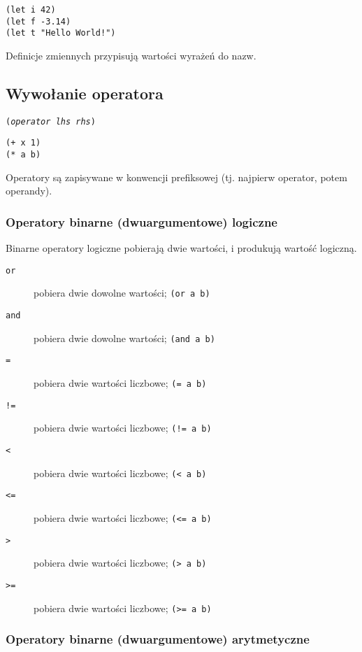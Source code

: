 \documentclass[11pt,oneside,a4paper,titlepage,onecolumn]{article}
\begin{document}
\begin{lstlisting}
(let i 42)
(let f -3.14)
(let t "Hello World!")
\end{lstlisting}

Definicje zmiennych przypisują wartości wyrażeń do nazw.

\subsection{Wywołanie operatora}

\texttt{(\emph{operator} \emph{lhs} \emph{rhs})}

\begin{lstlisting}
(+ x 1)
(* a b)
\end{lstlisting}

Operatory są zapisywane w konwencji prefiksowej (tj. najpierw operator, potem operandy).

\subsubsection{Operatory binarne (dwuargumentowe) logiczne}

Binarne operatory logiczne pobierają dwie wartości, i produkują wartość logiczną.

\begin{description}
    \item[\texttt{or}] pobiera dwie dowolne wartości; \texttt{(or a b)}
    \item[\texttt{and}] pobiera dwie dowolne wartości; \texttt{(and a b)}
    \item[\texttt{=}] pobiera dwie wartości liczbowe; \texttt{(= a b)}
    \item[\texttt{!=}] pobiera dwie wartości liczbowe; \texttt{(!= a b)}
    \item[\texttt{<}] pobiera dwie wartości liczbowe; \texttt{(< a b)}
    \item[\texttt{<=}] pobiera dwie wartości liczbowe; \texttt{(<= a b)}
    \item[\texttt{>}] pobiera dwie wartości liczbowe; \texttt{(> a b)}
    \item[\texttt{>=}] pobiera dwie wartości liczbowe; \texttt{(>= a b)}
\end{description}

\subsubsection{Operatory binarne (dwuargumentowe) arytmetyczne}
\end{document}
